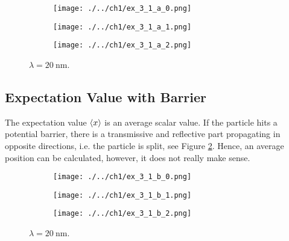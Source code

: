 \begin{figure}
	\centering
	\begin{subfigure}{1\linewidth}
		\texttt{[image: ./../ch1/ex\_3\_1\_a\_0.png]}
	\end{subfigure}
	
	\begin{subfigure}{1\linewidth}
		\texttt{[image: ./../ch1/ex\_3\_1\_a\_1.png]}
	\end{subfigure}
	
	\begin{subfigure}{1\linewidth}
		\texttt{[image: ./../ch1/ex\_3\_1\_a\_2.png]}
	\end{subfigure}
	
	\caption{$\lambda = \SI{20}{\nano\m}$.}
	\label{fig:ex_3_1_a}
\end{figure}

\subsection{Expectation Value with Barrier}

The expectation value $\braket{x}$ is an average scalar value.
If the particle hits a potential barrier, there is a transmissive
and reflective part propagating in opposite directions, i.e. the
particle is split, see Figure \ref{fig:ex_3_1_b}. Hence, an average
position can be calculated, however, it does not really make sense.

\begin{figure}
	\centering
	\begin{subfigure}{1\linewidth}
		\texttt{[image: ./../ch1/ex\_3\_1\_b\_0.png]}
	\end{subfigure}
	
	\begin{subfigure}{1\linewidth}
		\texttt{[image: ./../ch1/ex\_3\_1\_b\_1.png]}
	\end{subfigure}
	
	\begin{subfigure}{1\linewidth}
		\texttt{[image: ./../ch1/ex\_3\_1\_b\_2.png]}
	\end{subfigure}
	
	\caption{$\lambda = \SI{20}{\nano\m}$.}
	\label{fig:ex_3_1_b}
\end{figure}